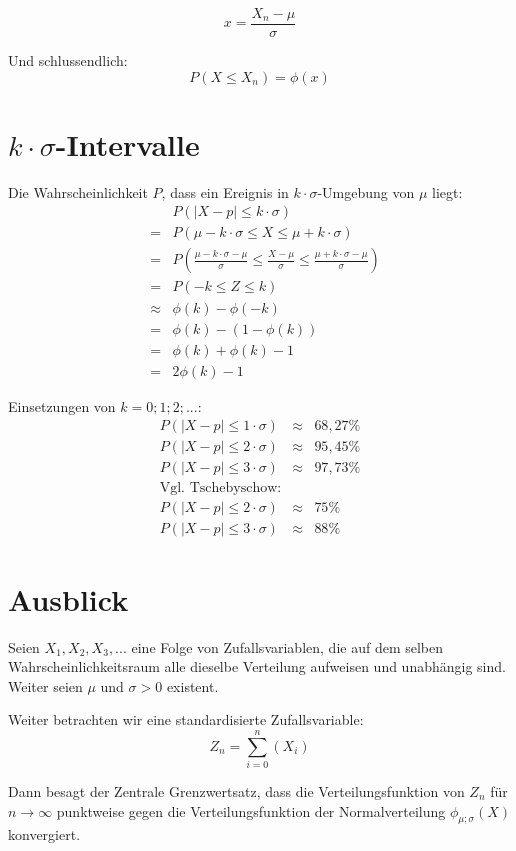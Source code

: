 \documentclass[12pt,a4paper,twocolumn]{article}
\begin{document}
$$
x = \frac{X_n - \mu}{\sigma}
$$

Und schlussendlich:
$$
P(X \le X_n) = \phi(x)
$$


\section{$k\cdot\sigma$-Intervalle}
Die Wahrscheinlichkeit $P$, dass ein Ereignis in $k \cdot \sigma$-Umgebung von $\mu$ liegt:\\

\begin{eqnarray}
& &P(|X-p|\le k\cdot\sigma)\\
 &=& P(\mu-k\cdot\sigma\le X \le \mu + k\cdot\sigma)\\
&=& P\left(\frac{\mu-k\cdot\sigma - \mu}{\sigma}\le \frac{X - \mu}{\sigma}\le \frac{\mu + k\cdot\sigma - \mu}{\sigma}\right) \nonumber \\
&=& P(-k \le Z \le k)\\
&\approx& \phi(k) - \phi(-k)\\
&=& \phi(k) - (1 - \phi(k))\\
&=& \phi(k) + \phi(k) - 1\\
&=& 2\phi(k)- 1
\end{eqnarray}

Einsetzungen von $ k = {0;1;2;...}$:
\begin{eqnarray}
P(|X-p|\le 1\cdot\sigma) &\approx& 68,27 \%\\
P(|X-p|\le 2\cdot\sigma) &\approx& 95,45 \%\\
P(|X-p|\le 3\cdot\sigma) &\approx& 97,73 \%\\
\text{Vgl. Tschebyschow:} \nonumber \\
P(|X-p|\le 2\cdot\sigma) &\approx& 75 \%\\
P(|X-p|\le 3\cdot\sigma) &\approx& 88 \%
\end{eqnarray}

\section{Ausblick}
Seien $X_1, X_2, X_3, ...$ eine Folge von Zufallsvariablen, die auf dem selben Wahrscheinlichkeitsraum alle dieselbe Verteilung aufweisen und unabhängig sind. Weiter seien $\mu$ und $\sigma > 0$ existent.

Weiter betrachten wir eine standardisierte Zufallsvariable:
$$ Z_n = \sum_{i = 0}^n(X_i)$$

Dann besagt der Zentrale Grenzwertsatz, dass die Verteilungsfunktion von $Z_n$ für $n \rightarrow \infty$ punktweise gegen die Verteilungsfunktion der Normalverteilung $\phi_{\mu;\sigma}(X)$ konvergiert. 
\end{document}
